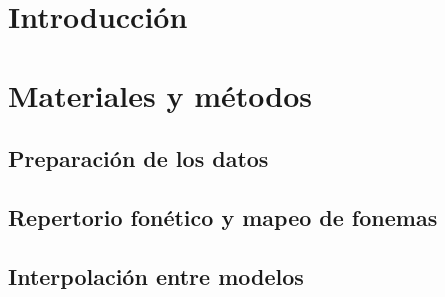 \documentclass[11pt,a4paper,twoside]{tesis}
\begin{document}

\def\autor{Franco Negri}
\def\tituloTesis{Implementación y evaluación de un sistema de síntesis de habla con acento extranjero variable}
\def\runtitle{Implementacíón y evaluación de un sistema de sintesis de habla}
\def\director{Agustín Gravano}
\def\lugar{Buenos Aires, 2018}


\frontmatter

\pagestyle{empty}
%
\cleardoublepage
\cleardoublepage

\cleardoublepage
\tableofcontents

\mainmatter
\pagestyle{headings}

%
\chapter{Introducción}

\chapter{Materiales y métodos}

\section{Preparación de los datos}\label{dataPrepartion}


\section{Repertorio fonético y mapeo de fonemas}\label{phoneMaping}


\section{Interpolación entre modelos}\label{modelInterpolation}

\end{document}
